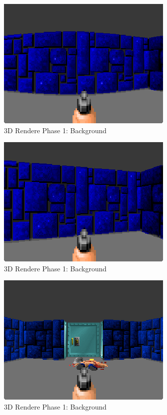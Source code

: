 \documentclass[book.tex]{subfiles}
\begin{document}
 \begin{figure}[H]
\centering
 \includegraphics[scale=1.3]{imgs/fish_eye/fish_eye.png}
 \caption{3D Rendere Phase 1: Background} \label{fig:mips}
 \end{figure}
 
  \begin{figure}[H]
\centering
 \includegraphics[scale=1.3]{imgs/fish_eye/fish_eye_corrected.png}
 \caption{3D Rendere Phase 1: Background} \label{fig:mips}
 \end{figure}
 
  \begin{figure}[H]
\centering
 \includegraphics[scale=1.3]{imgs/fish_eye/fish_eyed_start_screen2.png}
 \caption{3D Rendere Phase 1: Background} \label{fig:mips}
 \end{figure}
\end{document}
